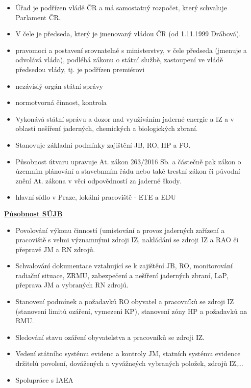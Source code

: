 \begin{itemize}

    \item Úřad je podřízen vládě ČR a má samostatný rozpočet, který schvaluje Parlament ČR.

    \item V čele je předseda, který je jmenovaný vládou ČR (od 1.11.1999 Drábová).
 
   \item pravomoci a postavení srovnatelné s ministerstvy, v čele předseda (jmenuje a odvolává vláda), podléhá zákonu o státní službě, zastoupení ve vládě předsedou vlády, tj. je podřízen premiérovi

   \item nezávislý orgán státní správy

   \item normotvorná činnost, kontrola

   \item Vykonává státní správu a dozor nad využíváním jaderné energie a IZ a v oblasti nešíření jaderných, chemických a biologických zbraní.

   \item Stanovuje základní podmínky zajištění JB, RO, HP a FO.

   \item Působnost útvaru upravuje At. zákon 263/2016 Sb. a částečně pak zákon o územním plánování a stavebnmím řádu nebo také trestní zákon či původní znění At. zákona v věci odpovědností za jaderné škody.

   \item hlavní sídlo v Praze, lokální pracoviště - ETE a EDU

\end{itemize}

\underline{\textbf{Působnost SÚJB}}

\begin{itemize}
    \item Povolování výkonu činností (umisťování a provoz jaderných zařízení a pracoviště s velmi významnými zdroji IZ, nakládání se zdroji IZ a RAO či přepravě JM a RN zdrojů.

    \item Schvalování dokumentace vztahující se k zajištění JB, RO, monitorování radiační situace, ZRMU, zabezpečení a nešíření jaderných zbraní, LaP, přeprava JM a vybraných RN zdrojů.

    \item Stanovení podmínek a požadavků RO obyvatel a pracovníků se zdroji IZ (stanovení limitů ozáření, vymezení KP), stanovení zóny HP a požadavků na RMU.

    \item Sledování stavu ozáření obyvatelstva a pracovníků se zdroji IZ.

    \item Vedení státního systému evidenc a kontroly JM, statních systému evidence držitelů povolení, dovážených a vyvážneých vybraných položek, zdrojů IZ,...

    \item Spolupráce s IAEA

\end{itemize}

